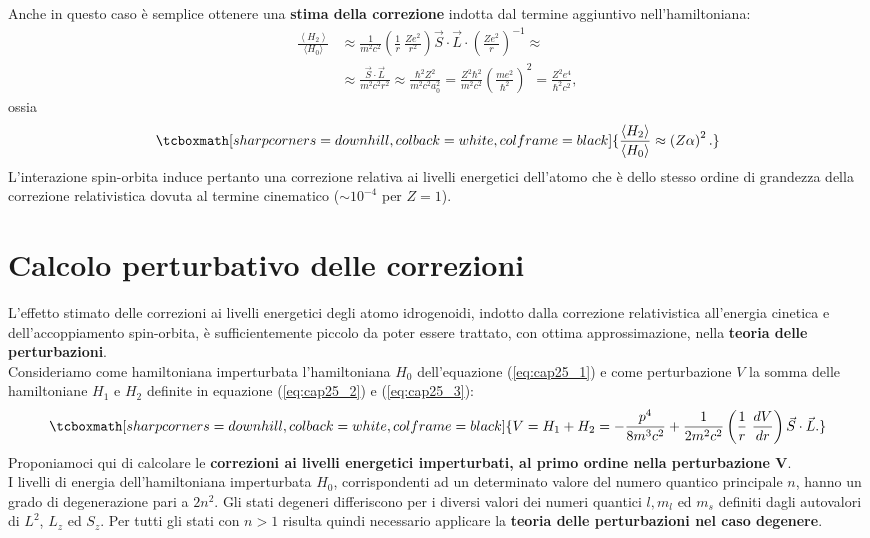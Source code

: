\documentclass[a4paper,12pt,oneside]{book}
\begin{document}
Anche in questo caso è semplice ottenere una \textbf{stima della correzione} indotta dal termine aggiuntivo nell'hamiltoniana:
	\begin{align}
		\frac{\left< H_2 \right>}{\langle H_0 \rangle} & \approx   \frac{1}{m^2c^2} \left( \frac{1}{r} \ \frac{ Ze^2}{r^2} \right) \vec{S} \cdot \vec{L} \cdot \left( \frac{Ze^2}{r} \right)^{-1} \approx \nonumber  \\
		& \approx  \frac{\vec{S} \cdot \vec{L}}{m^2c^2r^2} \approx  \frac{\hbar^2 Z^2}{m^2c^2a_0^2}=  \frac{Z^2 \hbar^2}{m^2c^2}\left( \frac{me^2}{\hbar^2} \right)^2= \frac{Z^2e^4}{\hbar^2c^2} ,
	\end{align}
ossia
	\begin{equation} 
		\tcboxmath[sharp corners=downhill, colback=white, colframe=black]{
		\frac{\left< H_2 \right>}{\langle H_0 \rangle} \approx \left( Z\alpha \right)^2 .
		}
	\end{equation}
L'interazione spin-orbita induce pertanto una correzione relativa ai livelli energetici dell'atomo che è dello stesso ordine di grandezza della correzione relativistica dovuta al termine cinematico ($\sim10^{-4}$ per $ Z =1$).
\section{Calcolo perturbativo delle correzioni}
L'effetto stimato delle correzioni ai livelli energetici degli atomo idrogenoidi, indotto dalla correzione relativistica all'energia cinetica e dell'accoppiamento spin-orbita, è sufficientemente piccolo da poter essere trattato, con ottima approssimazione, nella \textbf{teoria delle perturbazioni}. \\

Consideriamo come hamiltoniana imperturbata l'hamiltoniana $H_0$ dell'equazione (\ref{eq:cap25_1}) e come perturbazione $V$ la somma delle hamiltoniane $H_1$ e $H_2$ definite in equazione (\ref{eq:cap25_2}) e (\ref{eq:cap25_3}):
	\begin{equation} 
		\tcboxmath[sharp corners=downhill, colback=white, colframe=black]{
			V=H_1+H_2=-\frac{p^4}{8m^3c^2}+\frac{1}{2m^2c^2} \left( \frac{1}{r} \ \frac{dV}{dr} \right) \vec{S} \cdot \vec{L} .
			}
	\end{equation}
Proponiamoci qui di calcolare le \textbf{correzioni ai livelli energetici imperturbati, al primo ordine nella perturbazione $\boldsymbol{V}$}. \\

I livelli di energia dell'hamiltoniana imperturbata $H_0$, corrispondenti ad un determinato valore del numero quantico principale $n$, hanno un grado di degenerazione pari a $2n^2$. Gli stati degeneri differiscono per i diversi valori dei numeri quantici $l,m_l$ ed $m_s$ definiti dagli autovalori di $L^2$, $L_z$ ed $S_z$. Per tutti gli stati con $n>1$ risulta quindi necessario applicare la \textbf{teoria delle perturbazioni nel caso degenere}. \\
\end{document}
